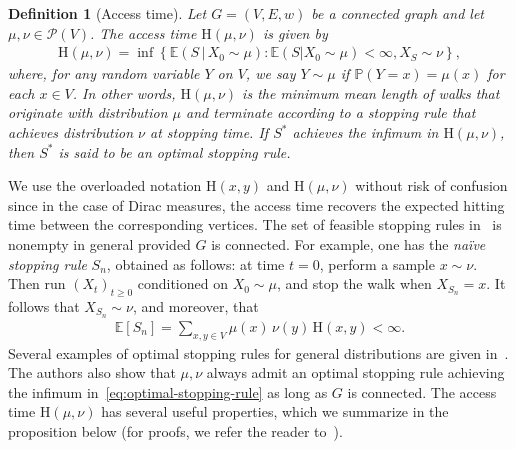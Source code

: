 \documentclass[11pt,a4paper]{article}
\newcommand{\Prob}{\mathscr{P}}
\newcommand{\Hitting}{\mathrm{H}}
\newcommand{\ep}[1]{\mathbb{E}\left({#1}\right)}
\newcommand{\pr}[1]{\mathbb{P}\left({#1}\right)}
\newtheorem{definition}[theorem]{Definition}
\begin{document}
\begin{definition}[Access time]\label{def:access-time}
    Let $G=(V,E,w)$ be a connected graph and let $\mu,\nu\in\Prob(V)$. The \emph{access time} $\Hitting(\mu,\nu)$ is given by
        \begin{align}\label{eq:optimal-stopping-rule}
            \Hitting(\mu,\nu) = \inf\left\{ \ep{S \,|\, X_0\sim\mu} : \ep{S |  X_0\sim\mu} < \infty, X_S\sim\nu \right\},
        \end{align}
    where, for any random variable $Y$ on $V$, we say $Y \sim\mu$ if $\pr{Y=x} = \mu(x)$ for each $x\in V$. In other words, $\Hitting(\mu,\nu)$ is the minimum mean length of walks that originate with distribution $\mu$ and terminate according to a stopping rule that achieves distribution $\nu$ at stopping time. If $S^\ast$ achieves the infimum in $\Hitting(\mu,\nu)$, then $S^\ast$ is said to be an \emph{optimal stopping rule}.
\end{definition}

We use the overloaded notation $\Hitting(x, y)$ and $\Hitting(\mu,\nu)$ without risk of confusion since in the case of Dirac measures, the access time recovers the expected hitting time between the corresponding vertices. The set of feasible stopping rules in~ is nonempty in general provided $G$ is connected. For example, one has the \emph{na\"{i}ve stopping rule} $S_{n}$, obtained as follows: at time $t=0$, perform a sample $x\sim\nu$. Then run $(X_t)_{t\ge 0}$ conditioned on $X_0\sim \mu$, and stop the walk when $X_{S_n} = x$. It follows that $X_{S_{n}} \sim\nu$, and moreover, that
    \begin{align}\label{eq:naive-stopping-rule}
        \mathbb{E}[S_n] = \sum_{x, y\in V} \mu(x)\,\nu(y)\,\Hitting(x,y) < \infty.
    \end{align}
Several examples of optimal stopping rules for general distributions are given in~\cite{lovasz1995mixing}. The authors also show that $\mu,\nu$ always admit an optimal stopping rule achieving the infimum in~\cref{eq:optimal-stopping-rule} as long as $G$ is connected. The access time $\Hitting(\mu,\nu)$ has several useful properties, which we summarize in the proposition below (for proofs, we refer the reader to~\cite{lovasz1995mixing}). 
\end{document}
